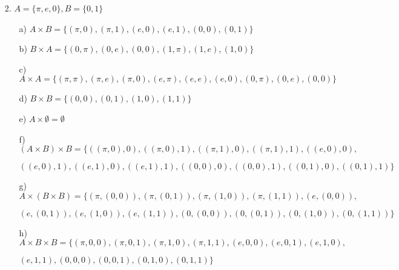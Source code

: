 \documentclass{article}
\begin{document}
\begin{enumerate}
    \item [2.] $A=\{\pi, e, 0\}, B=\{0,1\}$
    \begin{enumerate}
        \item[a)] $ A \times B = \{(\pi, 0),(\pi, 1),(e, 0),(e, 1),(0, 0),(0, 1)\}$
        \item[b)] $ B \times A = \{(0, \pi),(0, e),(0, 0),(1, \pi),(1, e),(1, 0)\}$
        \item[c)] $ A \times A = \{(\pi, \pi),(\pi, e),(\pi, 0),(e, \pi),(e, e),(e, 0),(0, \pi),(0, e),(0, 0)\}$
        \item[d)] $ B \times B = \{(0, 0),(0, 1),(1, 0),(1, 1)\}$
        \item[e)] $ A \times \emptyset = \emptyset$
        \item[f)] $ (A \times B) \times B = \{((\pi, 0), 0),((\pi, 0), 1),((\pi, 1), 0),((\pi, 1), 1),((e, 0), 0),$
        \item[] $ ((e, 0), 1),((e, 1), 0),((e, 1), 1),((0, 0), 0),((0, 0), 1),((0, 1), 0),((0, 1), 1)\} $
        \item[g)] $ A \times (B \times B) = \{(\pi, (0, 0)),(\pi, (0, 1)),(\pi, (1, 0)),(\pi, (1, 1)),(e, (0, 0)),$
        \item[] $ (e, (0, 1)),(e, (1, 0)),(e, (1, 1)),(0, (0, 0)),(0, (0, 1)),(0, (1, 0)),(0, (1, 1))\}$
        \item[h)] $ A \times B \times B = \{(\pi, 0, 0),(\pi, 0, 1),(\pi, 1, 0),(\pi, 1, 1),(e, 0, 0),(e, 0, 1),(e, 1, 0),$
        \item[] $ (e, 1, 1),(0, 0, 0),(0, 0, 1),(0, 1, 0),(0, 1, 1)\}$
    \end{enumerate}
\end{enumerate}
\end{document}
